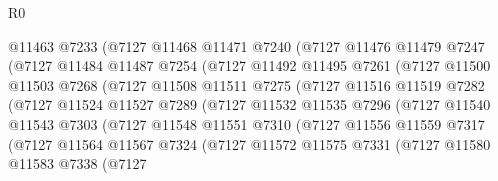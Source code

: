 \begin{lexlean}{R0}
\begin{coremodule}
                    @11463
                    @7233
                    (@7127
                      @11468
                      @11471
                      @7240
                      (@7127
                        @11476
                        @11479
                        @7247
                        (@7127
                          @11484
                          @11487
                          @7254
                          (@7127
                            @11492
                            @11495
                            @7261
                            (@7127
                              @11500
                              @11503
                              @7268
                              (@7127
                                @11508
                                @11511
                                @7275
                                (@7127
                                  @11516
                                  @11519
                                  @7282
                                  (@7127
                                    @11524
                                    @11527
                                    @7289
                                    (@7127
                                      @11532
                                      @11535
                                      @7296
                                      (@7127
                                        @11540
                                        @11543
                                        @7303
                                        (@7127
                                          @11548
                                          @11551
                                          @7310
                                          (@7127
                                            @11556
                                            @11559
                                            @7317
                                            (@7127
                                              @11564
                                              @11567
                                              @7324
                                              (@7127
                                                @11572
                                                @11575
                                                @7331
                                                (@7127
                                                  @11580
                                                  @11583
                                                  @7338
                                                  (@7127

\end{coremodule}
\end{lexlean}
